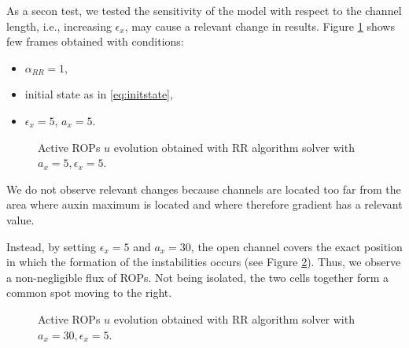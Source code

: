 As a secon test, we tested the sensitivity of the model with respect to the channel length, i.e., increasing $\epsilon_x$, may cause a relevant change in results. Figure \ref{fig:a5epsi5} shows few frames obtained with conditions:
\begin{itemize}
  \item $\alpha_{RR} = 1$,
  \item initial state as in \eqref{eq:initstate},
  \item $\epsilon_x = 5$, $a_x = 5$.
\end{itemize}

\begin{figure}[H]
    \centering
    \quad
    \quad
    \quad
    \caption[Tuning channel prm - $a_x = 5, \epsilon_x = 5$]{Active ROPs $u$ evolution obtained with RR algorithm solver with $a_x = 5, \epsilon_x = 5$.}
    \label{fig:a5epsi5}
\end{figure}
We do not observe relevant changes because channels are located too far from the area where auxin maximum is located and where therefore gradient has a relevant value.

Instead, by setting $\epsilon_x = 5$ and $a_x = 30$, the open channel covers the exact position in which the formation of the instabilities occurs (see Figure \ref{fig:a30epsi5}). Thus, we observe a non-negligible flux of ROPs. Not being isolated, the two cells together form a common spot moving to the right.
\begin{figure}[H]
    \centering
    \quad
    \quad
    \quad
    \quad
    \quad
    \quad
    \caption[Tuning channel prm - $a_x = 30, \epsilon_x = 5$]{Active ROPs $u$ evolution obtained with RR algorithm solver with $a_x = 30, \epsilon_x = 5$.}
    \label{fig:a30epsi5}
\end{figure}

